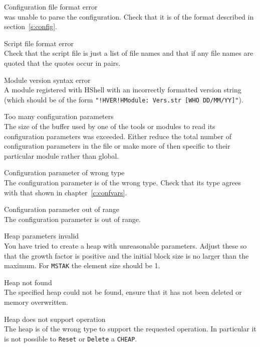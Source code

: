 \begin{itemize}
\begin{itemize}
    Configuration file format error\\
         was unable to parse the configuration. Check that
        it is of the format described in section~\ref{s:config}.

    Script file format error\\
        Check that the script file is just a list of file names and that
        if any file names are quoted that the quotes occur in pairs.

    Module version syntax error\\
        A module registered with HShell with an incorrectly formatted
        version string (which should be of the form
        \texttt{"!HVER!HModule: Vers.str [WHO DD/MM/YY]"}).

    Too many configuration parameters\\
        The size of the buffer used by one of the tools or modules to read
        its configuration parameters was exceeded.  Either reduce the total
        number of configuration parameters in the file or make more of then
        specific to their particular module rather than global.

    Configuration parameter of wrong type\\
        The configuration parameter is of the wrong type.  Check that its type 
        agrees with that shown in chapter~\ref{c:confvars}.

    Configuration parameter out of range\\
        The configuration parameter is out of range.  

\end{itemize}


\begin{itemize}
    Heap parameters invalid\\
        You have tried to create a heap with unreasonable parameters.  Adjust 
        these so that the growth factor is positive and the initial block 
        size is no larger than the maximum.  For \texttt{MSTAK} the element 
        size should be 1.

    Heap not found\\
        The specified heap could not be found, ensure that it has not been 
        deleted or memory overwritten.

    Heap does not support operation\\
        The heap is of the wrong type to support the requested operation.  In 
        particular it is not possible to \texttt{Reset} or \texttt{Delete} a
        \texttt{CHEAP}.


\end{itemize}
\end{itemize}
